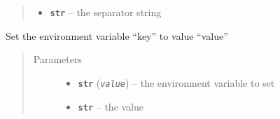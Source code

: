 \documentclass[a4paper,10pt,english]{sphinxmanual}
\begin{document}
\begin{fulllineitems}
\begin{fulllineitems}
\begin{quote}
\begin{description}
\begin{itemize}
\item {} 
\textbf{\texttt{str}} -- the separator string

\end{itemize}

\end{description}\end{quote}

\end{fulllineitems}


\begin{fulllineitems}
\label{commands/apidoc/src:src.fileEnviron.FileEnviron.set}
Set the environment variable ``key'' to value ``value''
\begin{quote}\begin{description}
\item[{Parameters}] \leavevmode\begin{itemize}
\item {} 
\textbf{\texttt{str}} (\emph{\texttt{value}}) -- the environment variable to set

\item {} 
\textbf{\texttt{str}} -- the value

\end{itemize}

\end{description}\end{quote}

\end{fulllineitems}


\end{fulllineitems}

\end{document}
